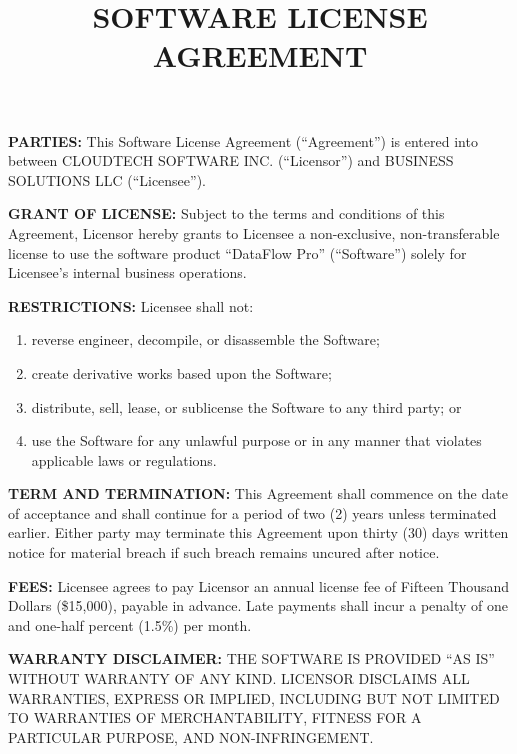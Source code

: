 \documentclass[12pt,letterpaper]{article}
\title{\textbf{SOFTWARE LICENSE AGREEMENT}}
\author{}
\date{}
\begin{document}
\maketitle

\noindent \textbf{PARTIES:} This Software License Agreement (``Agreement'') is entered into between CLOUDTECH SOFTWARE INC. (``Licensor'') and BUSINESS SOLUTIONS LLC (``Licensee'').

\vspace{0.3cm}
\noindent \textbf{GRANT OF LICENSE:} Subject to the terms and conditions of this Agreement, Licensor hereby grants to Licensee a non-exclusive, non-transferable license to use the software product ``DataFlow Pro'' (``Software'') solely for Licensee's internal business operations.

\vspace{0.3cm}
\noindent \textbf{RESTRICTIONS:} Licensee shall not: 
\begin{enumerate}[label=(\alph*)]
    \item reverse engineer, decompile, or disassemble the Software; 
    \item create derivative works based upon the Software; 
    \item distribute, sell, lease, or sublicense the Software to any third party; or 
    \item use the Software for any unlawful purpose or in any manner that violates applicable laws or regulations.
\end{enumerate}

\vspace{0.3cm}
\noindent \textbf{TERM AND TERMINATION:} This Agreement shall commence on the date of acceptance and shall continue for a period of two (2) years unless terminated earlier. Either party may terminate this Agreement upon thirty (30) days written notice for material breach if such breach remains uncured after notice.

\vspace{0.3cm}
\noindent \textbf{FEES:} Licensee agrees to pay Licensor an annual license fee of Fifteen Thousand Dollars (\$15,000), payable in advance. Late payments shall incur a penalty of one and one-half percent (1.5\%) per month.

\vspace{0.3cm}
\noindent \textbf{WARRANTY DISCLAIMER:} THE SOFTWARE IS PROVIDED ``AS IS'' WITHOUT WARRANTY OF ANY KIND. LICENSOR DISCLAIMS ALL WARRANTIES, EXPRESS OR IMPLIED, INCLUDING BUT NOT LIMITED TO WARRANTIES OF MERCHANTABILITY, FITNESS FOR A PARTICULAR PURPOSE, AND NON-INFRINGEMENT.
\end{document}
